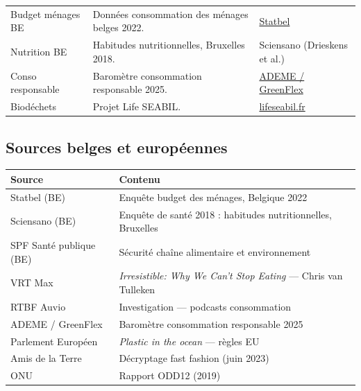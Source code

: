 \documentclass[a4paper,11pt]{article}
\newcommand{\tableheader}{\rowcolor{tableHeader}\bfseries}
\begin{document}
{\begin{tcolorbox}[card]
\begin{tabularx}{\textwidth}{@{}lXl@{}}
Budget ménages BE & Données consommation des ménages belges 2022. & \href{https://statbel.fgov.be/fr/themes/menages/budget-des-menages}{Statbel} \\
Nutrition BE & Habitudes nutritionnelles, Bruxelles 2018. & Sciensano (Drieskens et al.) \\
Conso responsable & Baromètre consommation responsable 2025. & \href{https://communication-responsable.ademe.fr/barometre-de-la-consommation-responsable-2025-greenflex-et-lademe}{ADEME / GreenFlex} \\
Biodéchets & Projet Life SEABIL. & \href{https://lifeseabil.fr/projet/life-seabil/}{lifeseabil.fr} \\
\bottomrule
\end{tabularx}
\end{tcolorbox}
}

\subsection{Sources belges et européennes}

\begin{tcolorbox}[card]
\begin{tabularx}{\textwidth}{@{}lX@{}}
\toprule
\tableheader Source & Contenu \\
\midrule
Statbel (BE) & Enquête budget des ménages, Belgique 2022 \\
Sciensano (BE) & Enquête de santé 2018 : habitudes nutritionnelles, Bruxelles \\
SPF Santé publique (BE) & Sécurité chaîne alimentaire et environnement \\
VRT Max & \textit{Irresistible: Why We Can't Stop Eating} — Chris van Tulleken \\
RTBF Auvio & Investigation — podcasts consommation \\
ADEME / GreenFlex & Baromètre consommation responsable 2025 \\
Parlement Européen & \textit{Plastic in the ocean} — règles EU \\
Amis de la Terre & Décryptage fast fashion (juin 2023) \\
ONU & Rapport ODD12 (2019) \\
\bottomrule
\end{tabularx}
\end{tcolorbox}

\newpage

\end{document}
